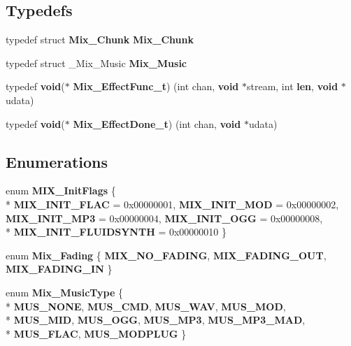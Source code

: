 \subsection*{Typedefs}
\begin{DoxyCompactItemize}
\item 
typedef struct {\bf Mix\+\_\+\+Chunk} {\bf Mix\+\_\+\+Chunk}
\item 
typedef struct \+\_\+\+Mix\+\_\+\+Music {\bf Mix\+\_\+\+Music}
\item 
typedef {\bf void}($\ast$ {\bf Mix\+\_\+\+Effect\+Func\+\_\+t}) (int chan, {\bf void} $\ast$stream, int {\bf len}, {\bf void} $\ast$udata)
\item 
typedef {\bf void}($\ast$ {\bf Mix\+\_\+\+Effect\+Done\+\_\+t}) (int chan, {\bf void} $\ast$udata)
\end{DoxyCompactItemize}
\subsection*{Enumerations}
\begin{DoxyCompactItemize}
\item 
enum {\bf M\+I\+X\+\_\+\+Init\+Flags} \{ \\*
{\bf M\+I\+X\+\_\+\+I\+N\+I\+T\+\_\+\+F\+L\+A\+C} = 0x00000001, 
{\bf M\+I\+X\+\_\+\+I\+N\+I\+T\+\_\+\+M\+O\+D} = 0x00000002, 
{\bf M\+I\+X\+\_\+\+I\+N\+I\+T\+\_\+\+M\+P3} = 0x00000004, 
{\bf M\+I\+X\+\_\+\+I\+N\+I\+T\+\_\+\+O\+G\+G} = 0x00000008, 
\\*
{\bf M\+I\+X\+\_\+\+I\+N\+I\+T\+\_\+\+F\+L\+U\+I\+D\+S\+Y\+N\+T\+H} = 0x00000010
 \}
\item 
enum {\bf Mix\+\_\+\+Fading} \{ {\bf M\+I\+X\+\_\+\+N\+O\+\_\+\+F\+A\+D\+I\+N\+G}, 
{\bf M\+I\+X\+\_\+\+F\+A\+D\+I\+N\+G\+\_\+\+O\+U\+T}, 
{\bf M\+I\+X\+\_\+\+F\+A\+D\+I\+N\+G\+\_\+\+I\+N}
 \}
\item 
enum {\bf Mix\+\_\+\+Music\+Type} \{ \\*
{\bf M\+U\+S\+\_\+\+N\+O\+N\+E}, 
{\bf M\+U\+S\+\_\+\+C\+M\+D}, 
{\bf M\+U\+S\+\_\+\+W\+A\+V}, 
{\bf M\+U\+S\+\_\+\+M\+O\+D}, 
\\*
{\bf M\+U\+S\+\_\+\+M\+I\+D}, 
{\bf M\+U\+S\+\_\+\+O\+G\+G}, 
{\bf M\+U\+S\+\_\+\+M\+P3}, 
{\bf M\+U\+S\+\_\+\+M\+P3\+\_\+\+M\+A\+D}, 
\\*
{\bf M\+U\+S\+\_\+\+F\+L\+A\+C}, 
{\bf M\+U\+S\+\_\+\+M\+O\+D\+P\+L\+U\+G}
 \}
\end{DoxyCompactItemize}
